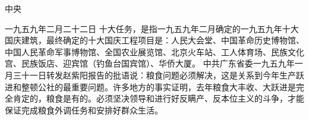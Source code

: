 \begin{maonote}
中央

一九五九年二月二十二日
十大任务，是指一九五九年二月确定的一九五九年十大国庆建筑，最终确定的十大国庆工程项目是：人民大会堂、中国革命历史博物馆、中国人民革命军事博物馆、全国农业展览馆、北京火车站、工人体育场、民族文化宫、民族饭店、迎宾馆（钓鱼台国宾馆）、华侨大厦。
中共广东省委一九五九年一月三十一日转发赵紫阳报告的批语说：粮食问题必须解决，这是关系到今年生产跃进和整顿公社的最重要问题。许多地方的事实证明，去年粮食大丰收、大跃进是完全肯定的，粮食是有的。必须坚决领导和进行好反瞒产、反本位主义的斗争，才能保证完成粮食外调任务和安排好群众生活。
\end{maonote}
